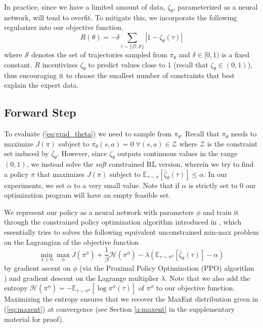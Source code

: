 \documentclass{article}
\begin{document}
In practice, since we have a limited amount of data, $\zeta_\theta$, parameterized as a neural network, will tend to overfit. To mitigate this, we incorporate the following regularizer into our objective function.
\begin{equation}
    R(\theta) = - \delta\sum_{\tau \sim \{\mathcal{D},\mathcal{S}\}} \left\vert 1 - \zeta_{\theta}(\tau) \right \vert
    \label{eq:reg}
\end{equation}
where $\mathcal{S}$ denotes the set of trajectories sampled from $\pi_\theta$ and $\delta \in [0,1)$ is a fixed constant. $R$ incentivizes $\zeta_\theta$ to predict values close to $1$ (recall that $\zeta_\theta\in(0,1)$), thus encouraging it to choose the smallest number of constraints that best explain the expert data.

\subsection{Forward Step}
\label{sec:fs}
To evaluate (\ref{eq:grad_theta}) we need to sample from $\pi_{\theta}$. Recall that $\pi_{\theta}$ needs to maximize $J(\pi)$ subject to $\pi_{\theta}(s,a) = 0\; \forall (s,a) \in \mathcal{Z}$ where $\mathcal{Z}$ is the constraint set induced by $\bar{\zeta}_\theta$. However, since $\zeta_\theta$ outputs continuous values in the range $(0,1)$, we instead solve the \textit{soft} constrained RL version, wherein we try to find a policy $\pi$ that maximizes $J(\pi)$ subject to $\mathbb{E}_{\tau\sim\pi}[\bar{\zeta}_\theta(\tau)] \leq \alpha$. In our experiments, we set $\alpha$ to a very small value. Note that if $\alpha$ is strictly set to $0$ our optimization program will have an empty feasible set.

We represent our policy as a neural network with parameters $\phi$ and train it through the constrained policy optimization algorithm introduced in \citet{tessler2018reward}, which essentially tries to solves the following equivalent unconstrained min-max problem on the Lagrangian of the objective function
\begin{equation}
	\min_{\lambda \geq 0} \max_\phi J(\pi^{\phi}) +\frac{1}{\beta}\mathcal{H}(\pi^{\phi}) - \lambda (\mathbb{E}_{\tau\sim\pi^{\phi}}[\bar{\zeta}_\theta(\tau)] - \alpha)
	\label{eq:min_max}
\end{equation}
by gradient ascent on $\phi$ (via the Proximal Policy Optimization (PPO) algorithm \citep{schulman2017proximal}) and gradient descent on the Lagrange multiplier $\lambda$. Note that we also add the entropy $\mathcal{H}(\pi^{\phi}) = -\mathbb{E}_{\tau\sim\pi^\phi}[\log \pi^\phi(\tau)]$ of $\pi^\phi$ to our objective function. Maximizing the entropy ensures that we recover the MaxEnt distribution given in (\ref{eq:maxent}) at convergence (see Section \ref*{a:maxent} in the supplementary material for proof).
\end{document}

